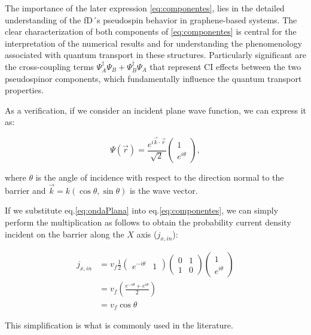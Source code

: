 The importance of the later expression \eqref{eq:componentes}, lies in the detailed understanding of the fD´s pseudospin behavior in  graphene-based systems. The clear characterization of both components of \eqref{eq:componentes} is central for the interpretation of the numerical results and for understanding the phenomenology associated with quantum transport in these structures.
Particularly significant are the cross-coupling terms $\Psi_A^\dagger\Psi_B + \Psi_B^\dagger\Psi_A$ that represent CI effects between the two pseudospinor components, which fundamentally influence the quantum transport properties.

As a verification, if we consider an incident plane wave function, we can express it as:

\begin{equation}
    \label{eq:ondaPlana}
    \Psi(\vec{r})=\frac{e^{i\vec{k}\cdot\vec{r}}}{\sqrt{2}}
    \begin{pmatrix}
        1 \\ e^{i\theta}
    \end{pmatrix},
\end{equation}

\noindent where $\theta$ is the angle of incidence with respect to the direction normal to the barrier and $\vec{k} = k(\cos\theta,\sin\theta)$ is the wave vector.

If we substitute eq.\eqref{eq:ondaPlana} into eq.\eqref{eq:componentes}, we can simply perform the multiplication as follows to obtain the probability current density incident on the barrier along the $X$ axis ($j_{x,in}$):

\begin{align}
    \label{eq:jdemostrada}
    j_{x, in}&=v_f\frac{1}{2}
    \begin{pmatrix}
        e^{-i\theta} & 1
    \end{pmatrix}
    \begin{pmatrix}
        0 & 1 \\
        1 & 0
    \end{pmatrix}
    \begin{pmatrix}
        1 \\ e^{i\theta}
    \end{pmatrix}\nonumber \\
    &=v_f\left( \frac{e^{-i\theta} + e^{i\theta}}{2} \right)\nonumber \\
    &=v_f\cos\theta
\end{align}

This simplification is what is commonly used in the literature\cite{DahalJPhysChemSolids2017, WuJAP2009}.


